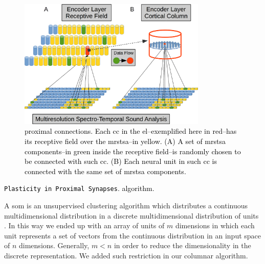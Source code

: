 \documentclass[10pt,letterpaper]{article}
\newcommand{\reviewerfour}[1]{\textcolor{black}{#1}}
\begin{document}
\begin{figure}[h!]
    \centering
    \includegraphics[width=0.8\textwidth]{EncoderProximalConnections.png}
    \caption{\reviewerfour{ proximal connections. Each \gls{cc} in the \gls{el}--exemplified here in red--has its receptive field over the \gls{mrstsa}--in yellow.
    (A) A set of \gls{mrstsa} components--in green inside the receptive field--is randomly chosen to be connected with such \gls{cc}.
    (B) Each neural unit in such \gls{cc} is connected with the same set of \gls{mrstsa} components.}}
    \label{fig:EncoderProximalConnections}
\end{figure}


\begin{algorithm}
	\caption{\reviewerfour{\texttt{Plasticity in Proximal Synapses}. \glsfirst{som} algorithm.}}
\label{csom_proximal_synapses}
\begin{algorithmic}[1]
\end{algorithmic}
\end{algorithm}

A \gls{som} is an unsupervised clustering algorithm which distributes a continuous multidimensional distribution
in a discrete multidimensional distribution of units \cite{Kohonen:1989:SAM:69371, kohonen_2082}.
In this way we ended up with an array of units of $m$ dimensions in which each unit
represents a set of vectors from the continuous distribution in an input space of $n$ dimensions.
Generally, $m < n$ in order to reduce the dimensionality in the discrete representation.
We added such restriction in our columnar algorithm.
\end{document}
